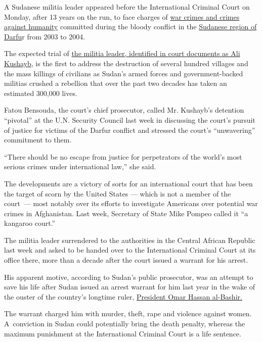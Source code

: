 A Sudanese militia leader appeared before the International Criminal
Court on Monday, after 13 years on the run, to face charges of
\href{https://www.nytimes3xbfgragh.onion/2019/12/22/world/africa/sudan-darfur-investigation.html}{war
crimes and crimes against humanity} committed during the bloody conflict
in the
\href{https://www.nytimes3xbfgragh.onion/2020/07/30/world/middleeast/darfur-sudan.html}{Sudanese
region of Darfu}r from 2003 to 2004.

The expected trial of
\href{https://www.nytimes3xbfgragh.onion/2020/06/09/world/africa/ali-kushayb-in-custody.html}{the
militia leader, identified in court documents as Ali Kushayb}, is the
first to address the destruction of several hundred villages and the
mass killings of civilians as Sudan's armed forces and government-backed
militias crushed a rebellion that over the past two decades has taken an
estimated 300,000 lives.

Fatou Bensouda, the court's chief prosecutor, called Mr. Kushayb's
detention ``pivotal'' at the U.N. Security Council last week in
discussing the court's pursuit of justice for victims of the Darfur
conflict and stressed the court's ``unwavering'' commitment to them.

``There should be no escape from justice for perpetrators of the world's
most serious crimes under international law,'' she said.

The developments are a victory of sorts for an international court that
has been the target of scorn by the United States --- which is not a
member of the court~--- most notably over its efforts to investigate
Americans over potential war crimes in Afghanistan. Last week, Secretary
of State Mike Pompeo called it ``a kangaroo court.''

The militia leader surrendered to the authorities in the Central African
Republic last week and asked to be handed over to the International
Criminal Court at its office there, more than a decade after the court
issued a warrant for his arrest.

His apparent motive, according to Sudan's public prosecutor, was an
attempt to save his life after Sudan issued an arrest warrant for him
last year in the wake of the ouster of the country's longtime ruler,
\href{https://www.nytimes3xbfgragh.onion/2020/07/30/world/middleeast/darfur-sudan.html}{President
Omar Hassan al-Bashir.}

The warrant charged him with murder, theft, rape and violence against
women. A~conviction in Sudan could potentially bring the death penalty,
whereas the maximum punishment at the International Criminal Court is a
life sentence.

